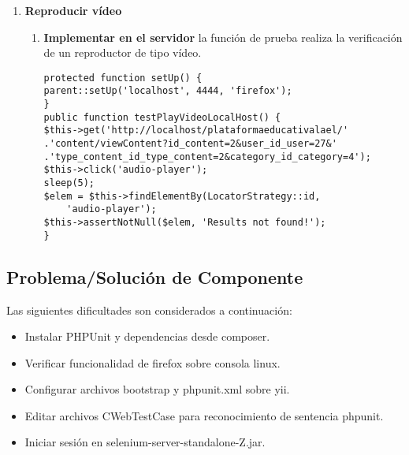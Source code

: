 \begin{itemize}
\begin{enumerate}
\item \textbf{Reproducir vídeo}

\begin{enumerate}

\item \textbf{Implementar en el servidor} la función de prueba
 realiza la verificación de un reproductor
de tipo vídeo.

\begin{lstlisting}
protected function setUp() {
parent::setUp('localhost', 4444, 'firefox');
}
public function testPlayVideoLocalHost() {
$this->get('http://localhost/plataformaeducativalael/'
.'content/viewContent?id_content=2&user_id_user=27&'
.'type_content_id_type_content=2&category_id_category=4');
$this->click('audio-player');
sleep(5);
$elem = $this->findElementBy(LocatorStrategy::id,
    'audio-player');
$this->assertNotNull($elem, 'Results not found!');
}
\end{lstlisting}

\end{enumerate}

\end{enumerate}

\end{itemize}

\subsection{Problema/Solución de Componente}

Las siguientes dificultades son considerados a continuación:

\begin{itemize}

\item Instalar PHPUnit y dependencias desde composer.
\item Verificar funcionalidad de firefox sobre consola linux.
\item Configurar archivos bootstrap y phpunit.xml sobre yii.
\item Editar archivos CWebTestCase para reconocimiento de sentencia phpunit.
\item Iniciar sesión en selenium-server-standalone-Z.jar.
 
\end{itemize}

